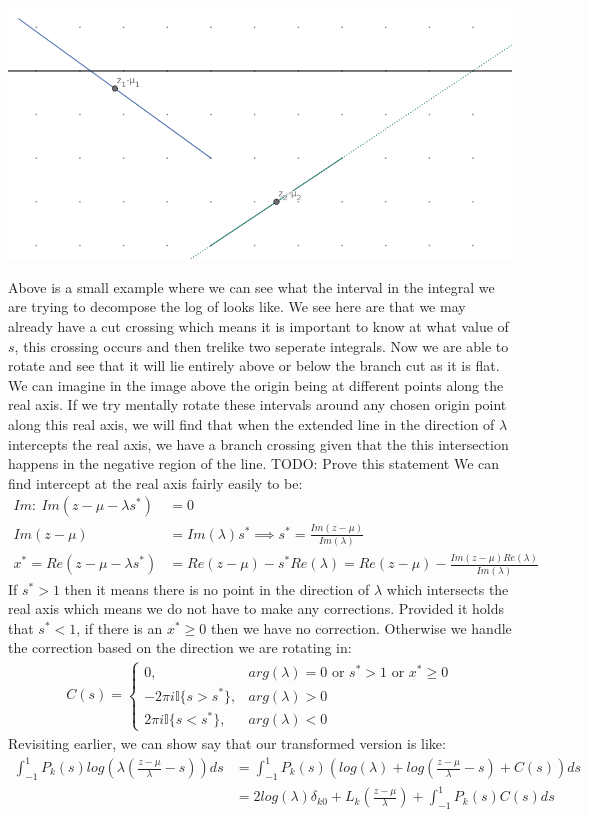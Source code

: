 \documentclass{article}
\begin{document}
\includegraphics[width=\textwidth]{intervaltransform}

Above is a small example where we can see what the interval in the integral we are trying to decompose the log of looks like.
We see here are that we may already have a cut crossing which means it is important to know at what value of $s$, this crossing occurs and then trelike two seperate integrals.
Now we are able to rotate and see that it will lie entirely above or below the branch cut as it is flat.
We can imagine in the image above the origin being at different points along the real axis.
If we try mentally rotate these intervals around any chosen origin point along this real axis, we will find that when the extended line in the direction of $\lambda$ intercepts the real axis, we have a branch crossing given that the this intersection happens in the negative region of the line.
TODO: Prove this statement
We can find intercept at the real axis fairly easily to be:
\begin{align}
    Im:\:Im(z-\mu-\lambda s^*)&=0\\
    Im(z-\mu)&=Im(\lambda)s^*\implies s^*=\frac{Im(z-\mu)}{Im(\lambda)}\\
    x^*=Re(z-\mu-\lambda s^*)&=Re(z-\mu)-s^*Re(\lambda)=Re(z-\mu)-\frac{Im(z-\mu)Re(\lambda)}{Im(\lambda)}
\end{align}
If $s^*>1$ then it means there is no point in the direction of $\lambda$ which intersects the real axis which means we do not have to make any corrections.
Provided it holds that $s^*<1$, if there is an $x^*\geq 0$ then we have no correction.
Otherwise we handle the correction based on the direction we are rotating in:
\begin{align}
    C(s)=\begin{cases}
	0,&arg(\lambda)=0\text{ or }s^*>1\text{ or }x^*\geq 0\\
	-2\pi i\mathbb{I}\{s>s^*\},&arg(\lambda)>0\\
	2\pi i\mathbb{I}\{s<s^*\},&arg(\lambda)<0
    \end{cases}
\end{align}
Revisiting earlier, we can show say that our transformed version is like:
\begin{align}
    \int_{-1}^1P_k(s)log(\lambda(\frac{z-\mu}{\lambda}-s))ds&=\int_{-1}^1P_k(s)(log(\lambda)+log(\frac{z-\mu}{\lambda}-s)+C(s))ds\\
    &=2log(\lambda)\delta_{k0}+L_k(\frac{z-\mu}{\lambda})+\int_{-1}^1P_k(s)C(s)ds
\end{align}
\end{document}

